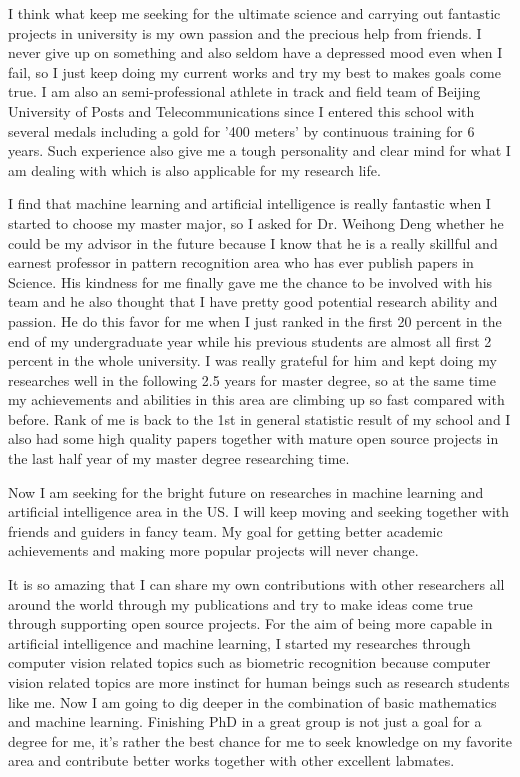 \documentclass[11pt, a4paper]{awesome-cv} %
\begin{document}
I think what keep me seeking for the ultimate science and carrying out fantastic projects in university is my own passion and the precious help from friends. I never give up on something and also seldom have a depressed mood even when I fail, so I just keep doing my current works and try my best to makes goals come true. I am also an semi-professional athlete in track and field team of Beijing University of Posts and Telecommunications since I entered this school with several medals including a gold for '400 meters' by continuous training for 6 years. Such experience also give me a tough personality and clear mind for what I am dealing with which is also applicable for my research life.

I find that machine learning and artificial intelligence is really fantastic when I started to choose my master major, so I asked for Dr. Weihong Deng whether he could be my advisor in the future because I know that he is a really skillful and earnest professor in pattern recognition area who has ever publish papers in Science. His kindness for me finally gave me the chance to be involved with his team and he also thought that I have pretty good potential research ability and passion. He do this favor for me when I just ranked in the first 20 percent in the end of my undergraduate year while his previous students are almost all first 2 percent in the whole university. I was really grateful for him and kept doing my researches well in the following 2.5 years for master degree, so at the same time my achievements and abilities in this area are climbing up so fast compared with before. Rank of me is back to the 1st in general statistic result of my school and I also had some high quality papers together with mature open source projects in the last half year of my master degree researching time.


Now I am seeking for the bright future on researches in machine learning and artificial intelligence area in the US. I will keep moving and seeking together with friends and guiders in fancy team. My goal for getting better academic achievements and making more popular projects will never change.

It is so amazing that I can share my own contributions with other researchers all around the world through my publications and try to make ideas come true through supporting open source projects. For the aim of being more capable in artificial intelligence and machine learning, I started my researches through computer vision related topics such as biometric recognition because computer vision related topics are more instinct for human beings such as research students like me. Now I am going to dig deeper in the combination of basic mathematics and machine learning. Finishing PhD in a great group is not just a goal for a degree for me, it's rather the best chance for me to seek knowledge on my favorite area and contribute better works together with other excellent labmates.
\end{document}

